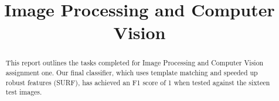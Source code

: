 \documentclass[conference]{IEEEtran}
\begin{document}
\title{Image Processing and Computer Vision\\
}
\author{
\and
{}
}


\maketitle

\begin{abstract}
This report outlines the tasks completed for Image Processing and Computer Vision assignment one. Our final classifier, which uses template matching and speeded up robust features (SURF), has achieved an F1 score of 1 when tested against the sixteen test images. 
\end{abstract}

\end{document}
